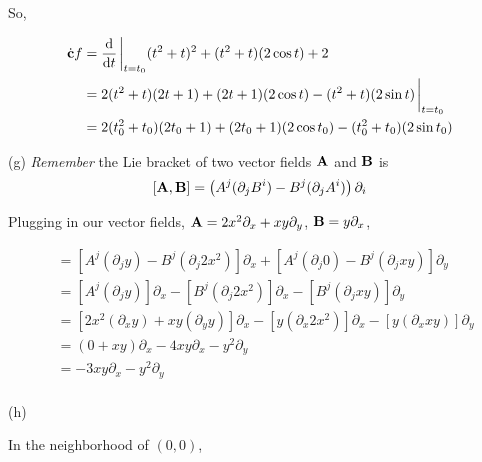 \documentclass[10pt]{article}
\begin{document}
\begin{enumerate}[start=1,label={\bfseries Exercise \arabic*:},leftmargin=1in]
        So,

        \begin{align*}
            \dot{\vb{c}} f &= \dv{t} \eval_{t=t_0} (t^2+t)^2 + (t^2+t)(2\cos{t}) + 2  \\
                           &= 2(t^2+t)(2t+1) + (2t+1)(2\cos{t}) - (t^2+t)(2\sin{t}) \eval_{t=t_0} \\
                           &= 2(t_0^2+t_0)(2t_0+1) + (2t_0+1)(2\cos{t_0}) - (t_0^2+t_0)(2\sin{t_0})
        \end{align*}

        \noindent (g) \emph{Remember} the Lie bracket of two vector fields \(\vb{A}\) and \(\vb{B}\) is \[ [\vb{A}, \vb{B}] = \left( A^j(\partial_j B^i) - B^j(\partial_j A^i) \right) \partial_i\]

        \noindent Plugging in our vector fields, \( \vb{A}=2x^2\partial_x  + xy\partial_y \), \( \vb{B} = y\partial_x \),

        \begin{align*}
            [\vb{A}, \vb{B}] &= [ A^j ( \partial_j y ) - B^j ( \partial_j 2x^2 ) ]\partial_x + [ A^j ( \partial_j 0 ) - B^j ( \partial_j xy )  ]\partial_y \\
                             &= [ A^j ( \partial_j y ) ]\partial_x - [ B^j ( \partial_j 2x^2 ) ]\partial_x - [ B^j ( \partial_j xy )  ]\partial_y \\
                             &= [ 2x^2(\partial_x y ) + xy(\partial_y y ) ]\partial_x - [ y(\partial_x 2x^2)]\partial_x - [ y (\partial_x xy)  ]\partial_y \\
                             &= (0+xy)\partial_x - 4xy\partial_x - y^2\partial_y \\
                             &= -3xy\partial_x - y^2\partial_y \\
        \end{align*}

        \noindent (h)

        \noindent In the neighborhood of \((0,0)\),


\end{enumerate}
\end{document}
